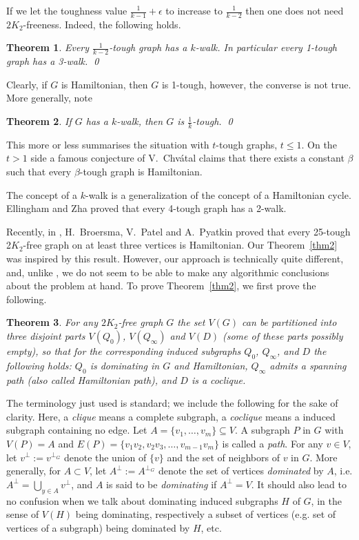 \documentclass{amsart}
\newtheorem{theorem}{Theorem}
\begin{document}
If we let the toughness value $\frac{1}{k-1}+\epsilon$ to increase to $\frac{1}{k-2}$ then
one does not need $2K_2$-freeness. Indeed, the following holds.
\begin{theorem}\cite{jackson1990k}\label{cthm1}
Every $\frac{1}{k-2}$-tough graph has a $k$-walk. 
In particular every 1-tough graph has a 3-walk. \qed
\end{theorem}
Clearly, if $G$ is
Hamiltonian, then $G$ is 1-tough, however, the converse is not true.  
More generally, note 
\begin{theorem}\cite{jackson1990k}\label{add}
If $G$ has a $k$-walk, then $G$ is $\frac{1}{k}$-tough. \qed
\end{theorem}

This more or less summarises the situation with $t$-tough graphs, $t\leq 1$.
On the $t>1$ side 
a famous conjecture of V.~Chv\'{a}tal \cite{chvatal1973tough} claims
that there exists a constant $\beta$ such that every
$\beta$-tough graph is Hamiltonian.  

The concept of a $k$-walk is a generalization of the concept of a Hamiltonian cycle.
Ellingham and Zha \cite{ellingham2000toughness} proved that
every 4-tough graph has a 2-walk.

Recently, in \cite{broersma2014toughness}, H.~Broersma, V.~Patel and A.~Pyatkin proved that 
every 25-tough 2$K_2$-free graph on at least three vertices is Hamiltonian.
Our Theorem~\ref{thm2} was inspired by this result.  
However, our
approach is technically quite different, and, unlike \cite{broersma2014toughness}, we do not seem to be
able to make any algorithmic conclusions about the problem at hand.
To prove Theorem~\ref{thm2}, we first prove the following.
\begin{theorem}\label{thm1}
For any $2K_2$-free graph $G$ the set $V(G)$ 
can be partitioned into three disjoint parts $V(Q_0)$, $V(Q_{\infty})$ and $V(D)$ (some of these parts possibly empty), so that for the corresponding induced subgraphs
$Q_0$, $Q_\infty$, and $D$ the following holds: $Q_0$ is dominating in $G$ and Hamiltonian, 
$Q_{\infty}$ admits a spanning path (also called Hamiltonian path), 
and $D$ is a coclique.
\end{theorem}
The terminology just used is standard; we include the following for the sake of clarity.
Here, a {\em clique} means a complete subgraph, a {\em coclique} means a
induced subgraph containing no edge. Let 
$A=\{v_1,\ldots,v_m\}\subseteq V$. A subgraph $P$ in $G$ with $V(P)=A$
and $E(P)=\{v_1v_2,v_2v_3,\ldots,v_{m-1}v_m\}$
is called a {\em path}.
For any $v\in V$, let 
$v^\perp:=v^{\perp_G}$ denote the union of $\{v\}$ and the set of neighbors of $v$ in $G$. 
More generally, 
for $A\subset V$, let $A^\perp:=A^{\perp_G}$ denote the set of vertices {\em dominated}
by $A$, i.e. $A^\perp=\bigcup\limits_{y\in A}v^\perp$, and
$A$ is said to be {\em dominating} if $A^\perp=V$. 
It should also lead to no confusion when we talk about  
dominating induced subgraphs $H$ of $G$, in the sense of $V(H)$ being
dominating, respectively
a subset of vertices (e.g. set of vertices of a subgraph) being dominated by $H$, etc.
\end{document}

